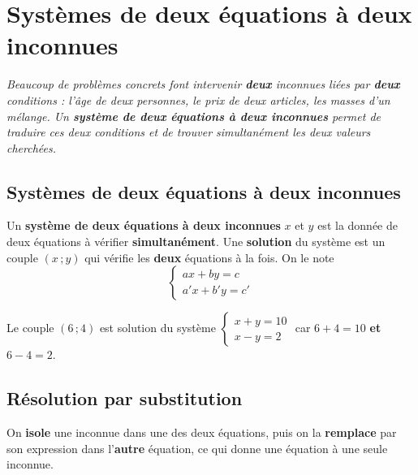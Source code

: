 \chapter{Systèmes de deux équations à deux inconnues}

\noindent\textit{Beaucoup de problèmes concrets font intervenir \textbf{deux} inconnues liées
par \textbf{deux} conditions : l'âge de deux personnes, le prix de deux articles, les masses
d'un mélange. Un \textbf{système de deux équations à deux inconnues} permet de traduire ces
deux conditions et de trouver simultanément les deux valeurs cherchées.}
\vspace{8pt}

\connecteBanner

\section{Systèmes de deux équations à deux inconnues}

\begin{definition}[Système]
Un \textbf{système de deux équations à deux inconnues} $x$ et $y$ est la donnée de deux
équations à vérifier \textbf{simultanément}. Une \textbf{solution} du système est un couple
$(x\,;y)$ qui vérifie les \textbf{deux} équations à la fois. On le note
\[
\left\{\begin{array}{l} ax+by=c\\ a'x+b'y=c' \end{array}\right.
\]
\end{definition}

\begin{exemple}
Le couple $(6\,;4)$ est solution du système $\left\{\begin{array}{l}x+y=10\\x-y=2\end{array}\right.$
car $6+4=10$ \textbf{et} $6-4=2$.
\end{exemple}

\section{Résolution par substitution}

\begin{propriete}
On \textbf{isole} une inconnue dans une des deux équations, puis on la \textbf{remplace} par
son expression dans l'\textbf{autre} équation, ce qui donne une équation à une seule
inconnue.
\end{propriete}

